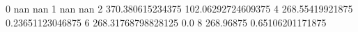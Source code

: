 0 nan nan
1 nan nan
2 370.380615234375 102.06292724609375
4 268.55419921875 0.23651123046875
6 268.31768798828125 0.0
8 268.96875 0.65106201171875
